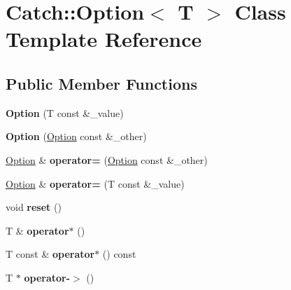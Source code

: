 \hypertarget{classCatch_1_1Option}{
\section{Catch::Option$<$ T $>$ Class Template Reference}
\label{classCatch_1_1Option}
}
\subsection*{Public Member Functions}
\begin{DoxyCompactItemize}
\item 
\hypertarget{classCatch_1_1Option_a5aeb9c22d48a6882bdf5fb4730b06c86}{
{\bfseries Option} (T const \&\_\-value)}
\label{classCatch_1_1Option_a5aeb9c22d48a6882bdf5fb4730b06c86}

\item 
\hypertarget{classCatch_1_1Option_af02f2e4559f06384baec0def8c68c5fd}{
{\bfseries Option} (\hyperlink{classCatch_1_1Option}{Option} const \&\_\-other)}
\label{classCatch_1_1Option_af02f2e4559f06384baec0def8c68c5fd}

\item 
\hypertarget{classCatch_1_1Option_a78c65b15dd6b2fbd04c5012c43017c8f}{
\hyperlink{classCatch_1_1Option}{Option} \& {\bfseries operator=} (\hyperlink{classCatch_1_1Option}{Option} const \&\_\-other)}
\label{classCatch_1_1Option_a78c65b15dd6b2fbd04c5012c43017c8f}

\item 
\hypertarget{classCatch_1_1Option_a2be7e343ab22d6061726d32ab4622653}{
\hyperlink{classCatch_1_1Option}{Option} \& {\bfseries operator=} (T const \&\_\-value)}
\label{classCatch_1_1Option_a2be7e343ab22d6061726d32ab4622653}

\item 
\hypertarget{classCatch_1_1Option_a37b4e0e5d4d56296adacd267a616f4e0}{
void {\bfseries reset} ()}
\label{classCatch_1_1Option_a37b4e0e5d4d56296adacd267a616f4e0}

\item 
\hypertarget{classCatch_1_1Option_afd989852fa453731c3190dac63caccb0}{
T \& {\bfseries operator$\ast$} ()}
\label{classCatch_1_1Option_afd989852fa453731c3190dac63caccb0}

\item 
\hypertarget{classCatch_1_1Option_a0f05708905dc6b0b470fb24f5d265631}{
T const \& {\bfseries operator$\ast$} () const }
\label{classCatch_1_1Option_a0f05708905dc6b0b470fb24f5d265631}

\item 
\hypertarget{classCatch_1_1Option_acad340798a16c8f700f8763119e90f31}{
T $\ast$ {\bfseries operator-\/$>$} ()}
\label{classCatch_1_1Option_acad340798a16c8f700f8763119e90f31}


\end{DoxyCompactItemize}
